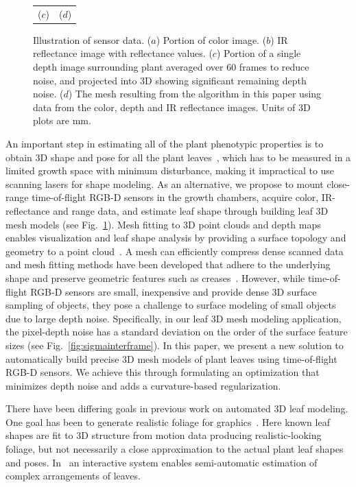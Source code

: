 \begin{figure}
\begin{center}
\begin{tabular}{ c c }
($c$) & ($d$) \\
\end{tabular}
\end{center}
\caption{Illustration of sensor data.  ($a$) Portion of color image. ($b$) IR reflectance image with reflectance values. ($c$) Portion of a single depth image surrounding plant averaged over 60 frames to reduce noise, and projected into $3$D showing significant remaining depth noise. ($d$)  The mesh resulting from the algorithm in this paper using data from the color, depth and IR reflectance images.  Units of $3$D plots are mm.  }
\label{fig:plantnoise}
\end{figure}


An important step in estimating all of the plant phenotypic properties is to obtain $3$D shape and pose for all the plant leaves~\cite{muller2015leaf}, which has to be measured in a limited growth space with minimum disturbance, making it impractical to use scanning lasers for shape modeling. As an alternative, we propose to mount close-range time-of-flight RGB-D sensors in the growth chambers, acquire color, IR-reflectance and range data, and estimate leaf shape through building leaf $3$D mesh models (see Fig.~\ref{fig:plantnoise}). Mesh fitting to $3$D point clouds and depth maps enables visualization and leaf shape analysis by providing a surface topology and geometry to a point cloud~\cite{Sienz2000,Yeh2011}.  A mesh can efficiently compress dense scanned data and mesh fitting methods have been developed that adhere to the underlying shape and preserve geometric features such as creases~\cite{hoppe:1994,Kobbelt:1998}. 
%
However, while time-of-flight RGB-D sensors are small, inexpensive and provide dense $3$D surface sampling of objects, they pose a challenge to surface modeling of small objects due to large depth noise. Specifically, in our leaf $3$D mesh modeling application, the pixel-depth noise has a standard deviation on the order of the surface feature sizes (see Fig.~\ref{fig:sigmainterframe}). In this paper, we present a new solution to automatically build precise $3$D mesh models of plant leaves using time-of-flight RGB-D sensors. We achieve this through formulating an optimization that minimizes depth noise and adds a curvature-based regularization.  

There have been differing goals in previous work on automated $3$D leaf modeling.   One goal has been to generate realistic foliage for graphics~\cite{Bradley:2013}.  Here known leaf shapes are fit to $3$D structure from motion data producing realistic-looking foliage, but not necessarily a close approximation to the actual plant leaf shapes and poses.  In~\cite{Quan:2006} an interactive system enables semi-automatic estimation of complex arrangements of leaves.  



